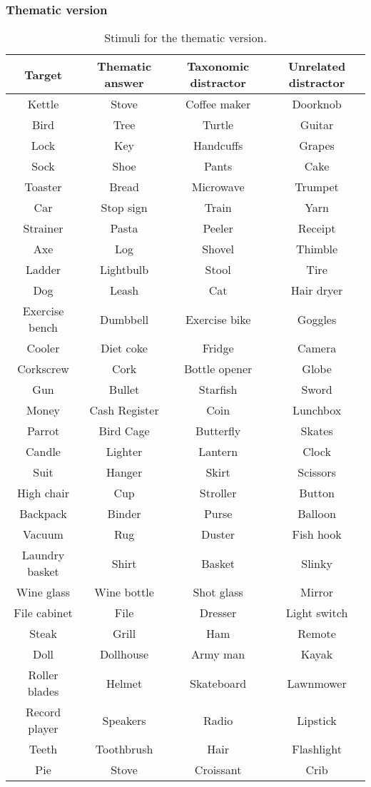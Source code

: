 \documentclass[../dissertation.tex]{subfiles}
\begin{document}
\newpage

\subsubsection{Thematic version}

\begin{table}[H]
\caption{Stimuli for the thematic version.}
\vspace{-10pt}
\begin{center}
\begin{tabular}{cccc}
\toprule
Target & Thematic answer & Taxonomic distractor & Unrelated distractor \\
\midrule
Kettle & Stove & Coffee maker & Doorknob \\
Bird & Tree & Turtle & Guitar \\
Lock & Key & Handcuffs & Grapes \\
Sock & Shoe & Pants & Cake \\
Toaster & Bread & Microwave & Trumpet \\
Car & Stop sign & Train & Yarn \\
Strainer & Pasta & Peeler & Receipt \\
Axe & Log & Shovel & Thimble \\
Ladder & Lightbulb & Stool & Tire \\
Dog & Leash & Cat & Hair dryer \\
Exercise bench & Dumbbell & Exercise bike & Goggles \\
Cooler & Diet coke & Fridge & Camera \\
Corkscrew & Cork & Bottle opener & Globe \\
Gun & Bullet & Starfish & Sword \\
Money & Cash Register & Coin & Lunchbox \\
Parrot & Bird Cage & Butterfly & Skates \\
Candle & Lighter & Lantern & Clock \\
Suit & Hanger & Skirt & Scissors \\
High chair & Cup & Stroller & Button \\
Backpack & Binder & Purse & Balloon \\
Vacuum & Rug & Duster & Fish hook \\
Laundry basket & Shirt & Basket & Slinky \\
Wine glass & Wine bottle & Shot glass & Mirror \\
File cabinet & File & Dresser & Light switch \\
Steak & Grill & Ham & Remote \\
Doll & Dollhouse & Army man & Kayak \\
Roller blades & Helmet & Skateboard & Lawnmower \\
Record player & Speakers & Radio & Lipstick \\
Teeth & Toothbrush & Hair & Flashlight \\
Pie & Stove & Croissant & Crib \\
\bottomrule
\end{tabular}
\label{themstim}
\end{center}
\end{table}
\end{document}
